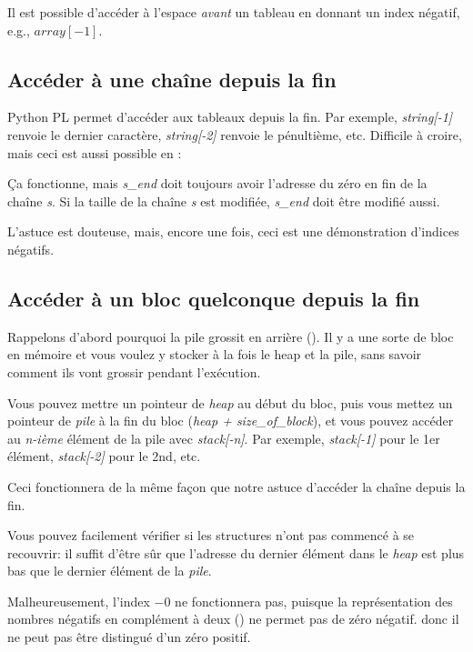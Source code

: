 \label{negative_array_indices}

Il est possible d'accéder à l'espace \emph{avant} un tableau en donnant un index négatif,
e.g., $array[-1]$.

\subsection{Accéder à une chaîne depuis la fin}

Python \ac{PL} permet d'accéder aux tableaux depuis la fin.
Par exemple, \emph{string[-1]} renvoie le dernier caractère, \emph{string[-2]} renvoie
le pénultième, etc.
Difficile à croire, mais ceci est aussi possible en \CCpp:



Ça fonctionne, mais \textit{s\_end} doit toujours avoir l'adresse du zéro en fin
de la chaîne \textit{s}. Si la taille de la chaîne \textit{s} est modifiée,
\textit{s\_end} doit être modifié aussi.

L'astuce est douteuse, mais, encore une fois, ceci est une démonstration d'indices
négatifs.

\subsection{Accéder à un bloc quelconque depuis la fin}

Rappelons d'abord pourquoi la pile grossit en arrière ().
Il y a une sorte de bloc en mémoire et vous voulez y stocker à la fois le heap et
la pile, sans savoir comment ils vont grossir pendant l'exécution.

Vous pouvez mettre un pointeur de \emph{heap} au début du bloc, puis vous mettez un
pointeur de \emph{pile} à la fin du bloc (\emph{heap + size\_of\_block}), et vous pouvez
accéder au \emph{n-ième} élément de la pile avec \emph{stack[-n]}.
Par exemple, \emph{stack[-1]} pour le 1er élément, \emph{stack[-2]} pour le 2nd, etc.

Ceci fonctionnera de la même façon que notre astuce d'accéder la chaîne depuis la
fin.

Vous pouvez facilement vérifier si les structures n'ont pas commencé à se recouvrir:
il suffit d'être sûr que l'adresse du dernier élément dans le \emph{heap} est plus
bas que le dernier élément de la \emph{pile}.

Malheureusement, l'index  $-0$ ne fonctionnera pas, puisque la représentation des
nombres négatifs en complément à deux () ne permet pas de
zéro négatif. donc il ne peut pas être distingué d'un zéro positif.

